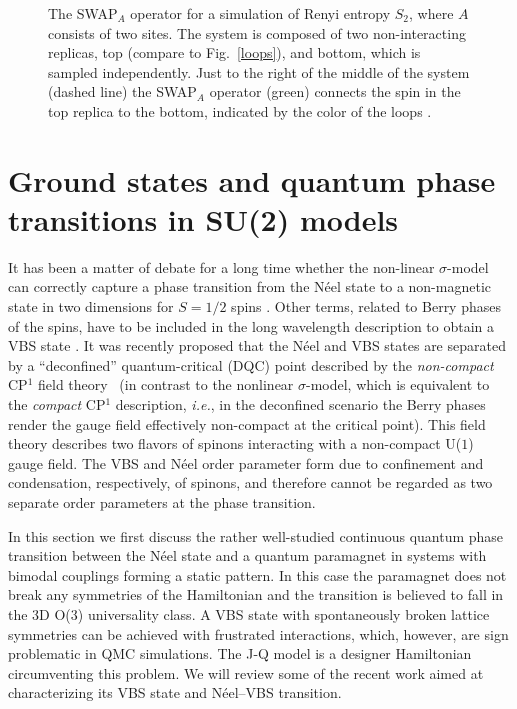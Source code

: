 \documentclass[range]{ar2e}
\begin{document}
\begin{figure}
\centerline{}
\caption{The {\rm SWAP}$_A$ operator for a simulation of Renyi entropy $S_2$, where $A$ consists of two sites.  The system is composed of two non-interacting 
replicas, top (compare to Fig.~\ref{loops}), and bottom, which is sampled independently.  Just to the right of the middle of the system (dashed line) 
the {\rm SWAP}$_A$ operator (green) connects the spin in the top replica to the bottom, indicated by the color of the loops \cite{Kallin11}.}
\label{swap}
\end{figure}

\section{Ground states and quantum phase transitions in SU(2) models}
\label{sec:su2models}

It has been a matter of debate for a long time whether the non-linear $\sigma$-model can correctly capture a phase transition from the N\'eel state 
to a non-magnetic state in two dimensions for $S=1/2$ spins \cite{Chakravarty89}. Other terms, related to Berry phases of the spins, have to be included in the long wavelength description to obtain a VBS state \cite{Read90,murthy1990:mono}. It was recently proposed that the N\'eel and VBS states are separated
by a ``deconfined'' quantum-critical (DQC) point \cite{Senthil04a} described by the {\it non-compact} CP$^1$ field theory~\cite{Motrunich04} (in contrast to the nonlinear 
$\sigma$-model, which is equivalent to the {\it compact} CP$^1$ description, {\em i.e.}, in the deconfined scenario the Berry phases render the gauge field effectively
non-compact at the critical point).
This field theory describes two flavors of spinons interacting with a non-compact U($1$) gauge field.  The VBS and N\'eel order parameter form due to confinement and condensation, 
respectively, of spinons, and therefore cannot be regarded as two separate order parameters at the phase transition.

In this section we first discuss the rather well-studied continuous quantum phase transition between the N\'eel state and a quantum paramagnet in systems 
with bimodal couplings forming a static pattern. In this case the paramagnet does not break any symmetries of the Hamiltonian and the transition 
is believed to fall in the 3D O($3$) universality class. A VBS state with spontaneously broken lattice symmetries can be achieved with frustrated 
interactions, which, however, are sign problematic in QMC simulations. The J-Q model \cite{Sandvik07} is a designer Hamiltonian circumventing this 
problem. We will review some of the recent work aimed at characterizing its VBS state and  N\'eel--VBS transition.
\end{document}
